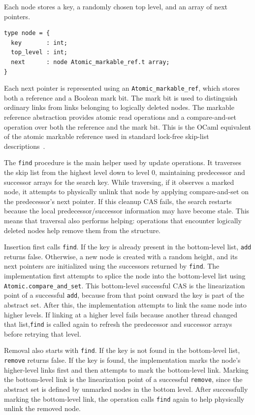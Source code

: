 \documentclass[11pt,a4paper]{article}
\begin{document}
Each node stores a key, a randomly chosen top level, and an array of next pointers.
\begin{lstlisting}[language=caml,caption={Node type for lock-free skip list.},label={lst:lockfree-node}]
type node = {
  key       : int;
  top_level : int;
  next      : node Atomic_markable_ref.t array;
}
\end{lstlisting}
Each next pointer is represented using an \texttt{Atomic\_markable\_ref}, which stores both a reference and a Boolean mark bit. The mark bit is used to distinguish ordinary links from links belonging to logically deleted nodes. The markable reference abstraction provides atomic read operations and a compare-and-set operation over both the reference and the mark bit. This is the OCaml equivalent of the atomic markable reference used in standard lock-free skip-list descriptions~\cite{herlihy2021art}.

The \texttt{find} procedure is the main helper used by update operations. It traverses the skip list from the highest level down to level 0, maintaining predecessor and successor arrays for the search key. While traversing, if it observes a marked node, it attempts to physically unlink that node by applying compare-and-set on the predecessor's next pointer. If this cleanup CAS fails, the search restarts because the local predecessor/successor information may have become stale. This means that traversal also performs helping: operations that encounter logically deleted nodes help remove them from the structure.

Insertion first calls \texttt{find}. If the key is already present in the bottom-level list, \texttt{add} returns false. Otherwise, a new node is created with a random height, and its next pointers are initialized using the successors returned by \texttt{find}. The implementation first attempts to splice the node into the bottom-level list using \texttt{Atomic.compare\_and\_set}. This bottom-level successful CAS is the linearization point of a successful \texttt{add}, because from that point onward the key is part of the abstract set. After this, the implementation attempts to link the same node into higher levels. If linking at a higher level fails because another thread changed that list,\texttt{find} is called again to refresh the predecessor and successor arrays before retrying that level.

Removal also starts with \texttt{find}. If the key is not found in the bottom-level list, \texttt{remove} returns false. If the key is found, the implementation marks the node's higher-level links first and then attempts to mark the bottom-level link. Marking the bottom-level link is the linearization point of a successful \texttt{remove}, since the abstract set is defined by unmarked nodes in the bottom level. After successfully marking the bottom-level link, the operation calls \texttt{find} again to help physically unlink the removed node.
\end{document}
